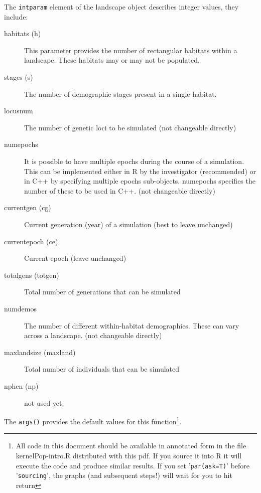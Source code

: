\documentclass[10pt]{article}
\newcommand{\code}[1]{\texttt{#1}}
\begin{document}
The \code{intparam} element of the landscape object describes integer values, they include:
\begin{description}

\item [habitats (h)] This parameter provides the number of rectangular
habitats within a landscape.  These habitats may or may not be
populated.

\item [stages (s)] The number of demographic stages present in a single habitat.

\item [locusnum] The number of genetic loci to be simulated (not changeable directly)

\item [numepochs ] It is possible to have multiple epochs during the
  course of a simulation.  This can be implemented either in R by the
  investigator (recommended) or in C++ by specifying multiple epochs
  sub-objects.  numepochs specifies the number of these to be used in
  C++.  (not changeable directly)

\item [currentgen (cg)] Current generation (year) of a simulation (best to leave unchanged)

\item [currentepoch (ce)] Current epoch (leave unchanged)

\item [totalgens (totgen)] Total number of generations that can be simulated

\item [numdemos] The number of different within-habitat demographies.
  These can vary across a landscape. (not changeable directly)

\item [maxlandsize (maxland)] Total number of individuals that can be simulated

\item [nphen (np)] not used yet.

\end{description}

The \code{args()} provides the default values for this
function\footnote{All code in this document should be available in
  annotated form in the file kernelPop-intro.R distributed with this pdf.
  If you source it into R it will execute the code and produce similar
  results.  If you set '\code{par(ask=T)}' before '\code{sourcing}',
  the graphs (and subsequent steps!) will wait for you to hit return}.
\end{document}

